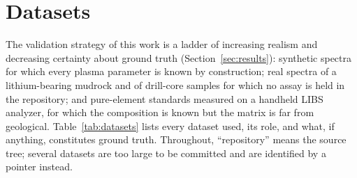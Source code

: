 \section{Datasets}
\label{sec:datasets}

The validation strategy of this work is a ladder of increasing realism and decreasing certainty about ground truth (Section~\ref{sec:results}): synthetic spectra for which every plasma parameter is known by construction; real spectra of a lithium-bearing mudrock and of drill-core samples for which no assay is held in the repository; and pure-element standards measured on a handheld LIBS analyzer, for which the composition is known but the matrix is far from geological. Table~\ref{tab:datasets} lists every dataset used, its role, and what, if anything, constitutes ground truth. Throughout, ``repository'' means the \alibz{} source tree; several datasets are too large to be committed and are identified by a pointer instead.

